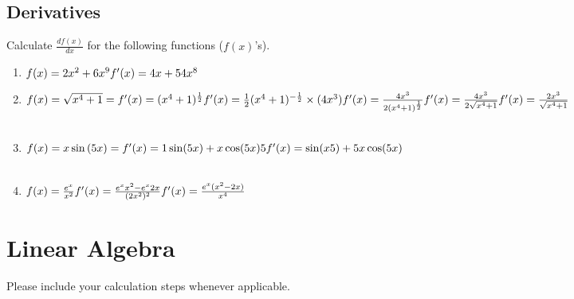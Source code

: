 \documentclass{assignment}
\begin{document}
\begin{problem}
\subsection{Derivatives}
\noindent Calculate $\frac{df(x)}{dx}$ for the following functions ($f(x)$'s).
\begin{enumerate}
    \item $f(x) = 2x^2 + 6x^9\\\\
    f'(x) = 4x + 54x^8$\\
    \item $f(x) = \sqrt{x^4 + 1} =\\\\
    f'(x) = (x^4+1)^\frac{1}{2}\\\\
    f'(x) = \frac{1}{2}(x^4+1)^{-\frac{1}{2}} \times (4x^3)\\\\
    f'(x) = \frac{4x^3}{2(x^4+1)^{\frac{1}{2}}}\\\\
    f'(x) = \frac{4x^3}{2\sqrt{x^4+1}}\\\\
    f'(x) = \frac{2x^3}{\sqrt{x^4+1}}$\\\\
    \item $f(x) = x \sin{(5x)} =\\\\
    f'(x) = 1\sin(5x)+x\cos(5x)5\\\\
    f'(x) = \sin(x5)+5x\cos(5x)$\\\\
    \item $f(x) = \frac{e^x}{x^2}\\\\
    f'(x) = \frac{e^x x^2 - e^x 2x}{(2x^2)^2}\\\\
    f'(x) = \frac{e^x(x^2-2x)}{x^4}\\\\$
\end{enumerate}
\newpage
\section{Linear Algebra}
\noindent Please include your calculation steps whenever applicable.


\end{problem}
\end{document}
